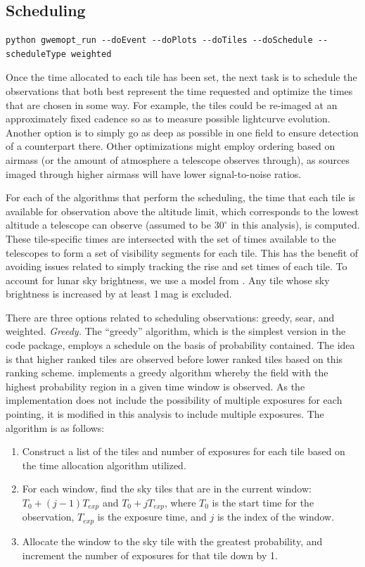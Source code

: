 \documentclass[twocolumn]{aastex62}
\begin{document}
\subsection{Scheduling}
\label{subsection:scheduling}
\begin{lstlisting}
python gwemopt_run --doEvent --doPlots --doTiles --doSchedule --scheduleType weighted
\end{lstlisting}
Once the time allocated to each tile has been set, the next task is to schedule the observations that both best represent the time requested and optimize the times that are chosen in some way. 
For example, the tiles could be re-imaged at an approximately fixed cadence so as to measure possible lightcurve evolution.
Another option is to simply go as deep as possible in one field to ensure detection of a counterpart there.
Other optimizations might employ ordering based on airmass (or the amount of atmosphere a telescope observes through), as sources imaged through higher airmass will have lower signal-to-noise ratios.

For each of the algorithms that perform the scheduling, the time that each tile is available for observation above the altitude limit, which corresponds to the lowest altitude a telescope can observe (assumed to be $30^\circ$ in this analysis), is computed.
These tile-specific times are intersected with the set of times available to the telescopes to form a set of visibility segments for each tile.
This has the benefit of avoiding issues related to simply tracking the rise and set times of each tile.
To account for lunar sky brightness, we use a model from \cite{CoSt2016b}. 
Any tile whose sky brightness is increased by at least 1\,mag is excluded.

There are three options related to scheduling observations: greedy, sear, and weighted.
\emph{Greedy.} The ``greedy'' algorithm, which is the simplest version in the code package, employs a schedule on the basis of probability contained. The idea is that higher ranked tiles are observed before lower ranked tiles based on this ranking scheme. \cite{RaSi2017} implements a greedy algorithm whereby the field with the highest probability region in a given time window is observed. As the \cite{RaSi2017} implementation does not include the possibility of multiple exposures for each pointing, it is modified in this analysis to include multiple exposures. The algorithm is as follows:

\begin{enumerate}
\item Construct a list of the tiles and number of exposures for each tile based on the time allocation algorithm utilized.
\item For each window, find the sky tiles that are in the current window: $T_0 + (j-1) T_{exp}$ and $T_0 + j T_{exp}$, where $T_0$ is the start time for the observation, $T_{exp}$ is the exposure time, and $j$ is the index of the window.
\item Allocate the window to the sky tile with the greatest probability, and increment the number of exposures for that tile down by 1.
\end{enumerate}
\end{document}
